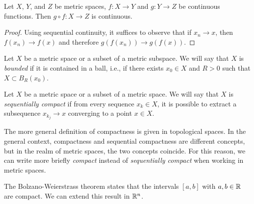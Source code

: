 \begin{theorem}%
  \label{th:continuita_funzione_composta_metrico}%
Let $X$, $Y$, and $Z$ be metric spaces, $f\colon X\to Y$ 
and $g\colon Y\to Z$ be continuous functions. 
Then $g\circ f\colon X\to Z$ is continuous.
\end{theorem}
\begin{proof}
  Using sequential continuity, it suffices to observe that 
  if $x_n\to x$, then $f(x_n)\to f(x)$ and therefore $g(f(x_n))\to g(f(x))$.
\end{proof}

\begin{definition}%
  \label{def:spazio_limitato}%
\mymark{*}%
Let $X$ be a metric space or a subset of a metric subspace. We will say that $X$
is
\emph{bounded}%
 if it is contained in a ball, i.e., if
there exists $x_0\in X$ and $R>0$ such that $X\subset B_R(x_0)$.
\end{definition}

\begin{definition}%
  \label{def:sequenzialmente_compatto}%
\mymark{**}%
Let $X$ be a metric space or a subset of a
metric space. We will say that $X$ is
\emph{sequentially compact}%
 if from every
sequence $x_k \in X$, it is possible to extract a subsequence $x_{k_j}\to x$
converging to a point $x\in X$.
\end{definition}

The more general definition of compactness is given in topological spaces.
In the general context, compactness and sequential compactness are different
concepts,
but in the realm of metric spaces, the two concepts coincide.
For this reason, we can write more briefly \emph{compact}%
instead of \emph{sequentially compact} when working in metric spaces.

The Bolzano-Weierstrass theorem states that the intervals $[a,b]$ with
$a,b\in {\mathbb R}$ are compact. 
We can extend this result in ${\mathbb R}^n$.

